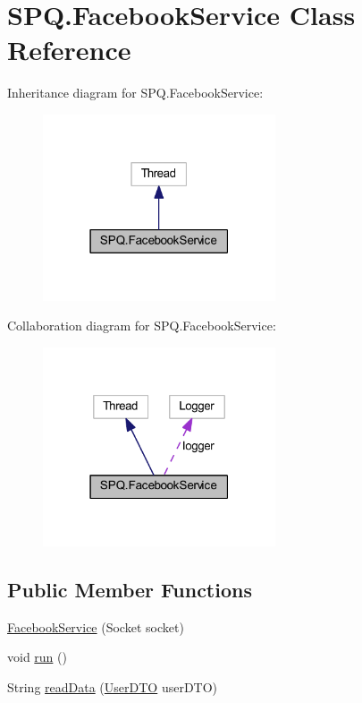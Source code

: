 \hypertarget{class_s_p_q_1_1_facebook_service}{}\section{S\+P\+Q.\+Facebook\+Service Class Reference}
\label{class_s_p_q_1_1_facebook_service}


Inheritance diagram for S\+P\+Q.\+Facebook\+Service\+:\nopagebreak
\begin{figure}[H]
\begin{center}
\leavevmode
\includegraphics[width=195pt]{class_s_p_q_1_1_facebook_service__inherit__graph}
\end{center}
\end{figure}


Collaboration diagram for S\+P\+Q.\+Facebook\+Service\+:\nopagebreak
\begin{figure}[H]
\begin{center}
\leavevmode
\includegraphics[width=195pt]{class_s_p_q_1_1_facebook_service__coll__graph}
\end{center}
\end{figure}
\subsection*{Public Member Functions}
\begin{DoxyCompactItemize}
\item 
\mbox{\hyperlink{class_s_p_q_1_1_facebook_service_a87c0122d98acc55bde0e958f59916887}{Facebook\+Service}} (Socket socket)
\item 
void \mbox{\hyperlink{class_s_p_q_1_1_facebook_service_a24a62bc6a32966419548314bc417abfb}{run}} ()
\item 
String \mbox{\hyperlink{class_s_p_q_1_1_facebook_service_a087e3aab2d870149c0ef74f3adf75efa}{read\+Data}} (\mbox{\hyperlink{class_s_p_q_1_1dto_1_1_user_d_t_o}{User\+D\+TO}} user\+D\+TO)
\end{DoxyCompactItemize}


